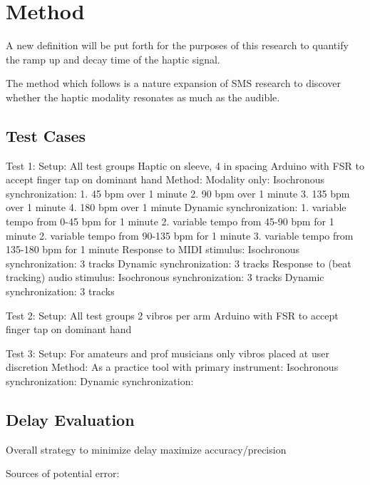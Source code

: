 \chapter{Method}
A new definition will be put forth for the purposes of this research to quantify the ramp up and decay time of the haptic signal. 

The method which follows is a nature expansion of SMS research to discover whether the haptic modality resonates as much as the audible.

\section{Test Cases}
Test 1:
    Setup:
        All test groups
        Haptic on sleeve, 4 in spacing
        Arduino with FSR to accept finger tap on dominant hand
    Method:
        Modality only:
            Isochronous synchronization:
                1. 45 bpm over 1 minute
                2. 90 bpm over 1 minute
                3. 135 bpm over 1 minute
                4. 180 bpm over 1 minute
            Dynamic synchronization:
                1. variable tempo from 0-45 bpm for 1 minute
                2. variable tempo from 45-90 bpm for 1 minute
                2. variable tempo from 90-135 bpm for 1 minute
                3. variable tempo from 135-180 bpm for 1 minute
        Response to MIDI stimulus:
            Isochronous synchronization:
                3 tracks
            Dynamic synchronization:
                3 tracks
        Response to (beat tracking) audio stimulus:
            Isochronous synchronization:
                3 tracks
            Dynamic synchronization:
                3 tracks

Test 2:
    Setup:
        All test groups    
        2 vibros per arm
        Arduino with FSR to accept finger tap on dominant hand

Test 3:
    Setup:
        For amateurs and prof musicians only
        vibros placed at user discretion   
    Method:
        As a practice tool with primary instrument:
            Isochronous synchronization:
            Dynamic synchronization: 

\section{Delay Evaluation}

Overall strategy to minimize delay maximize accuracy/precision

Sources of potential error:

